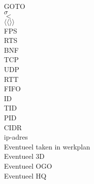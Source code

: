 GOTO\\
$\sigma$\\
$<$\\
$\langle\langle \rangle\rangle$\\
FPS\\
RTS\\
BNF\\
TCP\\
UDP\\
RTT\\
FIFO\\
ID\\
TID\\
PID\\
CIDR\\
ip-adres\\
Eventueel taken in werkplan\\ 
Eventueel 3D\\
Eventueel OGO\\
Eventueel HQ\\